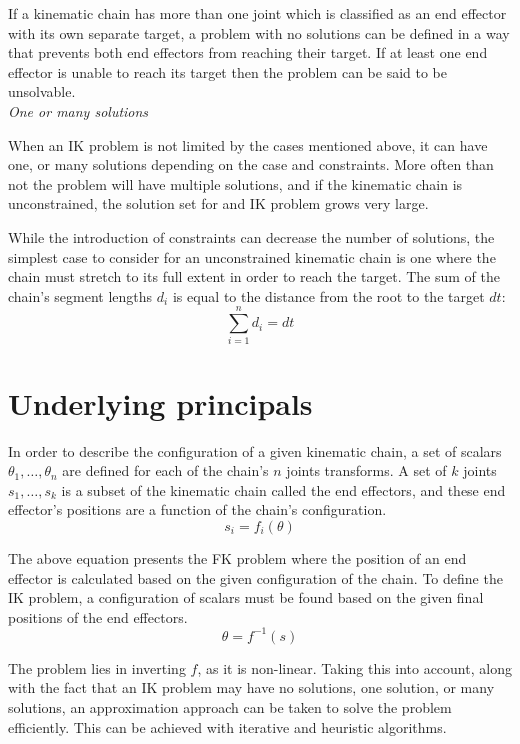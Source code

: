 If a kinematic chain has more than one joint which is classified as an end
effector with its own separate target, a problem with no solutions can be
defined in a way that prevents both end effectors from reaching their target.
If at least one end effector is unable to reach its target then the problem can
be said to be unsolvable. \\

\noindent\textit{One or many solutions}

When an IK problem is not limited by the cases mentioned above, it can have one,
or many solutions depending on the case and constraints. More often than not the
problem will have multiple solutions, and if the kinematic chain is
unconstrained, the solution set for and IK problem grows very large.

While the introduction of constraints can decrease the number of solutions, the
simplest case to consider for an unconstrained kinematic chain is one where the
chain must stretch to its full extent in order to reach the target. The sum of
the chain's segment lengths \(d_i\) is equal to the distance from the root to
the target \(dt\):
\begin{equation}
    \sum_{i=1}^{n}d_i = dt
\end{equation}

\section{Underlying principals}
In order to describe the configuration of a given kinematic chain, a set of
scalars \(\theta_1, \dots, \theta_n\) are defined for each of the chain's \(n\)
joints transforms. A set of \(k\) joints \(s_1, \dots, s_k\) is a subset of
the kinematic chain called the end effectors, and these end effector's positions
are a function of the chain's configuration.
\begin{equation}
    s_i = f_i(\theta)
\end{equation}

The above equation presents the FK problem where the position of an end effector is
calculated based on the given configuration of the chain. To define the IK
problem, a configuration of scalars must be found based on the given final
positions of the end effectors.
\begin{equation}
    \theta = f^{-1}(s)
\end{equation}

The problem lies in inverting \(f\), as it is non-linear. Taking this into
account, along with the fact that an IK problem may have no solutions, one
solution, or many solutions, an approximation approach can be taken to solve
the problem efficiently. This can be achieved with iterative and heuristic
algorithms.

